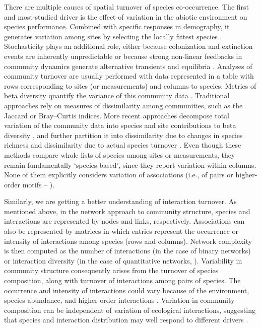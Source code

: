 \documentclass[12pt]{article}
\begin{document}
There are multiple causes of spatial turnover of species co-occurrence. The first
and most-studied driver is the effect of variation in the abiotic environment
on species performance. Combined with specific responses in demography, it
generates variation among sites by selecting the locally fittest species
\citep{Leibold2004}. Stochasticity plays an additional role, either because
colonization and extinction events \citep{Hanski1999} are inherently
unpredictable or because strong non-linear feedbacks in community dynamics
generate alternative transients and equilibria \citep{Chase2007, Vellend2014}.
Analyses of community turnover are usually performed with data represented in
a table with rows corresponding to sites (or measurements) and columns to
species. Metrics of beta diversity quantify the variance of this community
data \citep{Legendre2005}. Traditional approaches rely on measures of
dissimilarity among communities, such as the Jaccard or Bray–Curtis indices.
More recent approaches decompose total variation of the community data into
species and site contributions to beta diversity \citep{Legendre2013}, and
further partition it into dissimilarity due to changes in species richness and
dissimilarity due to actual species turnover \citep{Baselga2010;
Carvalho2012}. Even though these methods compare whole lists of species among
sites or measurements, they remain fundamentally `species-based', since they
report variation within columns. None of them explicitly considers variation
of associations (i.e., of pairs or higher-order motifs –
\citealt{Stouffer2007}).

Similarly, we are getting a better understanding of interaction turnover. As
mentioned above, in the network approach to community structure, species and
interactions are represented by nodes and links, respectively. Associations
can also be represented by matrices in which entries represent the occurrence
or intensity of interactions among species (rows and columns). Network
complexity is then computed as the number of interactions (in the case of
binary networks) or interaction diversity (in the case of quantitative
networks, \citealt{Bersier2002}). Variability in community structure
consequently arises from the turnover of species composition, along with
turnover of interactions among pairs of species. The occurrence and intensity
of interactions could vary because of the environment, species abundance, and
higher-order interactions \citep{Poisot2015a}. Variation in community
composition can be independent of variation of ecological
interactions, suggesting that species and interaction distribution may well
respond to different drivers \citep{Poisot2012}.
\end{document}
